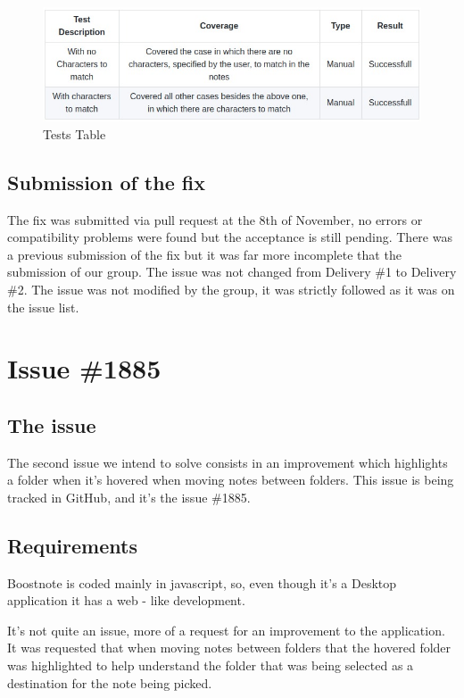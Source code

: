 \begin{figure}
\centering
\includegraphics[width=5.72917in]{../TestCharactersTable.jpeg}
\caption{Tests Table}
\end{figure}

\subsection{Submission of the fix}\label{submission-of-the-fix}

The fix was submitted via pull request at the 8th of November, no errors
or compatibility problems were found but the acceptance is still
pending. There was a previous submission of the fix but it was far more
incomplete that the submission of our group. The issue was not changed
from Delivery \#1 to Delivery \#2. The issue was not modified by the
group, it was strictly followed as it was on the issue list.

\section{Issue \#1885}\label{issue-1885}

\subsection{The issue}\label{the-issue-1}

The second issue we intend to solve consists in an improvement which
highlights a folder when it's hovered when moving notes between folders.
This issue is being tracked in GitHub, and it's the issue \#1885.

\subsection{Requirements}\label{requirements-1}

Boostnote is coded mainly in javascript, so, even though it's a Desktop
application it has a web - like development.

It's not quite an issue, more of a request for an improvement to the
application. It was requested that when moving notes between folders
that the hovered folder was highlighted to help understand the folder
that was being selected as a destination for the note being picked.

